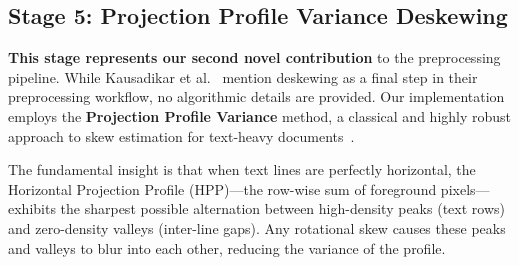 \documentclass[12pt, a4paper]{article}
\begin{document}
\vspace{0.3em}
\noindent{}


\subsection{Stage 5: Projection Profile Variance Deskewing}
\label{sec:deskew}

\textbf{This stage represents our second novel contribution} to the preprocessing pipeline. While Kausadikar et al.~\cite{kausadikar2025} mention deskewing as a final step in their preprocessing workflow, no algorithmic details are provided. Our implementation employs the \textbf{Projection Profile Variance} method, a classical and highly robust approach to skew estimation for text-heavy documents~\cite{postl1986, baird1987}.

The fundamental insight is that when text lines are perfectly horizontal, the Horizontal Projection Profile (HPP)---the row-wise sum of foreground pixels---exhibits the sharpest possible alternation between high-density peaks (text rows) and zero-density valleys (inter-line gaps). Any rotational skew causes these peaks and valleys to blur into each other, reducing the variance of the profile.
\end{document}
